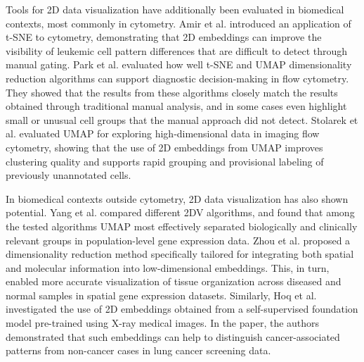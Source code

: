 \documentclass[a4paper,fleqn]{cas-dc}
\begin{document}
Tools for 2D data visualization have additionally been evaluated in biomedical contexts, most commonly in cytometry. Amir et al. \cite{visne_article} introduced an application of t-SNE to cytometry, demonstrating that 2D embeddings can improve the visibility of leukemic cell pattern differences that are difficult to detect through manual gating. Park et al. \cite{cytometry_2d_embeddings} evaluated how well t-SNE and UMAP dimensionality reduction algorithms can support diagnostic decision‑making in flow cytometry. They showed that the results from these algorithms closely match the results obtained through traditional manual analysis, and in some cases even highlight small or unusual cell groups that the manual approach did not detect. Stolarek et al. \cite{umap_imaging_flow_cytometry} evaluated UMAP for exploring high‑dimensional data in imaging flow cytometry, showing that the use of 2D embeddings from UMAP improves clustering quality and supports rapid grouping and provisional labeling of previously unannotated cells.

In biomedical contexts outside cytometry, 2D data visualization has also shown potential. Yang et al. \cite{clinical_data_2d_visualization_comparison} compared different 2DV algorithms, and found that among the tested algorithms UMAP most effectively separated biologically and clinically relevant groups in population-level gene expression data. Zhou et al. \cite{spasne} proposed a dimensionality reduction method specifically tailored for integrating both spatial and molecular information into low-dimensional embeddings. This, in turn, enabled more accurate visualization of tissue organization across diseased and normal samples in spatial gene expression datasets. Similarly, Hoq et al. \cite{dino_clinical_data_2d} investigated the use of 2D embeddings obtained from a self-supervised foundation model pre-trained using X-ray medical images. In the paper, the authors demonstrated that such embeddings can help to distinguish cancer-associated patterns from non-cancer cases in lung cancer screening data.
\end{document}
